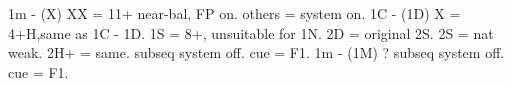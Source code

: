 1m - (X)
    XX = 11+ near-bal, FP on. others = system on.
1C - (1D)
    X = 4+H,same as 1C - 1D. 1S = 8+, unsuitable for 1N.
    2D = original 2S. 2S = nat weak. 2H+ = same.
    subseq system off. cue = F1.
1m - (1M)
    ?
    subseq system off. cue = F1.